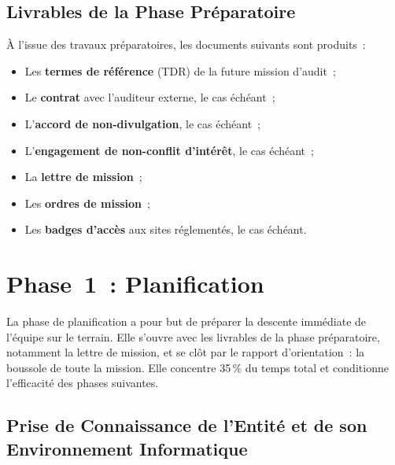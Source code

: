\subsection{Livrables de la Phase Préparatoire}
\label{subsec:livrables-prep}

À l'issue des travaux préparatoires, les documents suivants sont produits~:
\begin{itemize}
    \item Les \textbf{termes de référence} (TDR) de la future mission d'audit~;
    \item Le \textbf{contrat} avec l'auditeur externe, le cas échéant~;
    \item L'\textbf{accord de non-divulgation}, le cas échéant~;
    \item L'\textbf{engagement de non-conflit d'intérêt}, le cas échéant~;
    \item La \textbf{lettre de mission}~;
    \item Les \textbf{ordres de mission}~;
    \item Les \textbf{badges d'accès} aux sites réglementés, le cas échéant.
\end{itemize}

\section{Phase~1~: Planification}
\label{sec:planification}

La phase de planification a pour but de préparer la descente immédiate de l'équipe
sur le terrain. Elle s'ouvre avec les livrables de la phase préparatoire, notamment
la lettre de mission, et se clôt par le rapport d'orientation~: la boussole de toute
la mission. Elle concentre 35\,\% du temps total et conditionne l'efficacité des
phases suivantes.

\subsection{Prise de Connaissance de l'Entité et de son Environnement Informatique}
\label{subsec:prise-connaissance}

